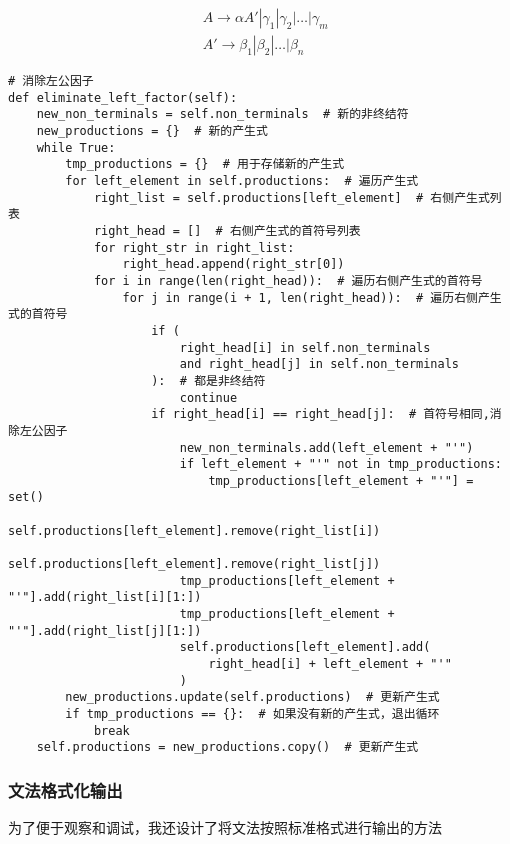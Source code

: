 \documentclass[lang=cn,11pt,a4paper]{elegantpaper}
\begin{document}
$$
\begin{aligned}
& A\rightarrow \alpha A'|\gamma_1|\gamma_2|\ldots|\gamma_m \\
& A'\rightarrow \beta_1|\beta_2|\ldots|\beta_n
\end{aligned}
$$

\begin{lstlisting}
# 消除左公因子
def eliminate_left_factor(self):
    new_non_terminals = self.non_terminals  # 新的非终结符
    new_productions = {}  # 新的产生式
    while True:
        tmp_productions = {}  # 用于存储新的产生式
        for left_element in self.productions:  # 遍历产生式
            right_list = self.productions[left_element]  # 右侧产生式列表
            right_head = []  # 右侧产生式的首符号列表
            for right_str in right_list:
                right_head.append(right_str[0])
            for i in range(len(right_head)):  # 遍历右侧产生式的首符号
                for j in range(i + 1, len(right_head)):  # 遍历右侧产生式的首符号
                    if (
                        right_head[i] in self.non_terminals
                        and right_head[j] in self.non_terminals
                    ):  # 都是非终结符
                        continue
                    if right_head[i] == right_head[j]:  # 首符号相同,消除左公因子
                        new_non_terminals.add(left_element + "'")
                        if left_element + "'" not in tmp_productions:
                            tmp_productions[left_element + "'"] = set()
                        self.productions[left_element].remove(right_list[i])
                        self.productions[left_element].remove(right_list[j])
                        tmp_productions[left_element + "'"].add(right_list[i][1:])
                        tmp_productions[left_element + "'"].add(right_list[j][1:])
                        self.productions[left_element].add(
                            right_head[i] + left_element + "'"
                        )
        new_productions.update(self.productions)  # 更新产生式
        if tmp_productions == {}:  # 如果没有新的产生式，退出循环
            break
    self.productions = new_productions.copy()  # 更新产生式
\end{lstlisting}

\subsubsection{文法格式化输出}

为了便于观察和调试，我还设计了将文法按照标准格式进行输出的方法
\end{document}
